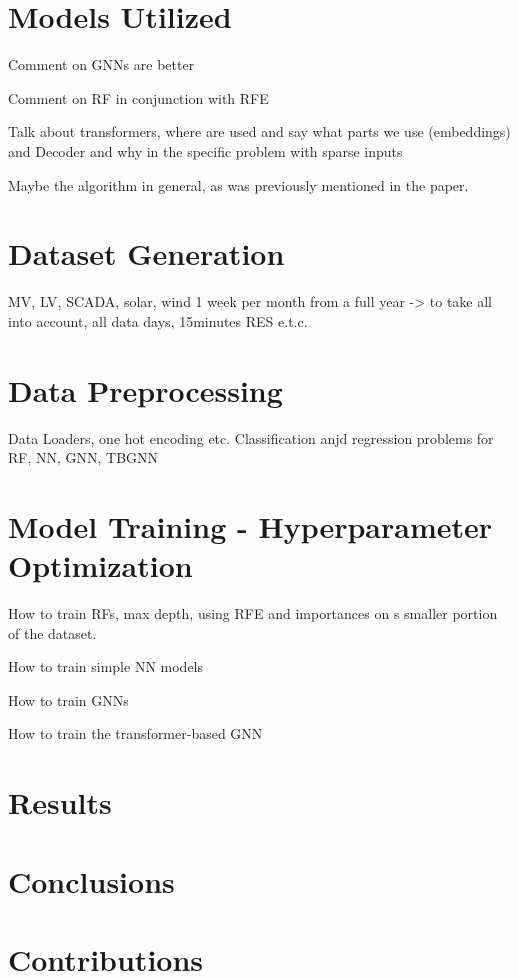 \documentclass[journal]{IEEEtran}  %
\begin{document}
\section{Models Utilized}

Comment on GNNs are better

Comment on RF in conjunction with RFE

Talk about transformers, where are used and say what parts we use (embeddings) and Decoder and why in the specific problem with sparse inputs

Maybe the algorithm in general, as was previously mentioned in the paper.

\section{Dataset Generation}

MV, LV, SCADA, solar, wind 1 week per month from a full year -> to take all into account, all data days, 15minutes RES e.t.c.

\section{Data Preprocessing}

Data Loaders, one hot encoding etc. Classification anjd regression problems for RF, NN, GNN, TBGNN

\section{Model Training - Hyperparameter Optimization}

How to train RFs, max depth, using RFE and importances on s smaller portion of the dataset.

How to train simple NN models

How to train GNNs

How to train the transformer-based GNN


\section{Results}

\section{Conclusions}



\section{Contributions}
\end{document}
